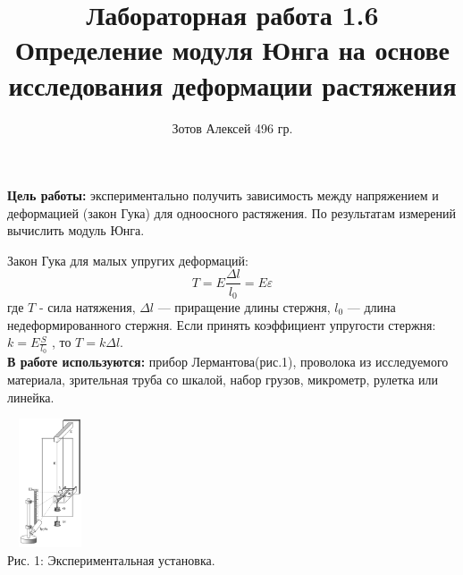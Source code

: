 \documentclass[8pt]{article}
\begin{document}
    \author {Зотов Алексей 496 гр.}
    \title {Лабораторная работа 1.6 \\  Определение модуля Юнга на основе исследования деформации растяжения}
    \maketitle{}

    \textbf{Цель работы:} экспериментально получить зависимость между напряжением и деформацией (закон Гука) для одноосного растяжения. По результатам измерений вычислить модуль Юнга.

    Закон Гука для малых упругих деформаций:
    \begin{equation}
        T = E \frac{\Delta l}{l_0} = E\varepsilon
    \end{equation}
    где $T$ - сила натяжения,  $\Delta l$ — приращение длины стержня, $l_0$ — длина недеформированного стержня.
    Если принять коэффициент упругости стержня: $k=E\frac{S}{l_0}$ , то $T = k \Delta l$. \\


    \textbf{В работе используются:} прибор Лермантова(рис.1), проволока из исследуемого материала, зрительная труба со шкалой, набор грузов, микрометр, рулетка или линейка.

    \begin{center} 
        \includegraphics[width=1.0in,height=1.5in]{tool.png} \\ Рис. 1: Экспериментальная установка.
    \end{center}
\end{document}
